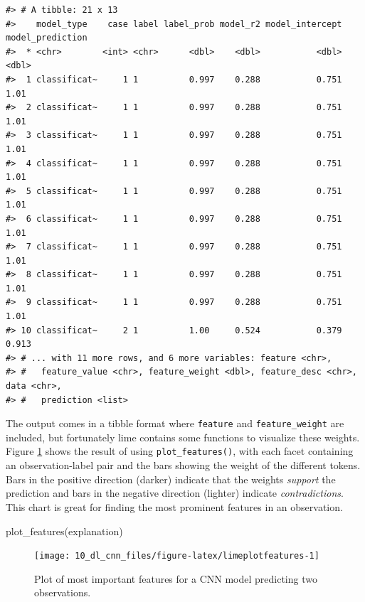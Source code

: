 \documentclass[
]{krantz}
\makeatletter
\newenvironment{Shaded}{\begin{snugshade}}{\end{snugshade}}
\newcommand{\FunctionTok}[1]{\textcolor[rgb]{0.00,0.00,0.00}{#1}}
\newcommand{\NormalTok}[1]{#1}
\newenvironment{kframe}{%
\medskip{}
\setlength{\fboxsep}{.8em}
 \def\at@end@of@kframe{}%
 \ifinner\ifhmode%
  \def\at@end@of@kframe{\end{minipage}}%
  \begin{minipage}{\columnwidth}%
 \fi\fi%
 \def\FrameCommand##1{\hskip\@totalleftmargin \hskip-\fboxsep
 \colorbox{shadecolor}{##1}\hskip-\fboxsep
     \hskip-\linewidth \hskip-\@totalleftmargin \hskip\columnwidth}%
 \MakeFramed {\advance\hsize-\width
   \@totalleftmargin\z@ \linewidth\hsize
   \@setminipage}}%
 {\par\unskip\endMakeFramed%
 \at@end@of@kframe}
\renewenvironment{Shaded}{\begin{kframe}}{\end{kframe}}
\makeatother
\begin{document}
\begin{verbatim}
#> # A tibble: 21 x 13
#>    model_type    case label label_prob model_r2 model_intercept model_prediction
#>  * <chr>        <int> <chr>      <dbl>    <dbl>           <dbl>            <dbl>
#>  1 classificat~     1 1          0.997    0.288           0.751            1.01 
#>  2 classificat~     1 1          0.997    0.288           0.751            1.01 
#>  3 classificat~     1 1          0.997    0.288           0.751            1.01 
#>  4 classificat~     1 1          0.997    0.288           0.751            1.01 
#>  5 classificat~     1 1          0.997    0.288           0.751            1.01 
#>  6 classificat~     1 1          0.997    0.288           0.751            1.01 
#>  7 classificat~     1 1          0.997    0.288           0.751            1.01 
#>  8 classificat~     1 1          0.997    0.288           0.751            1.01 
#>  9 classificat~     1 1          0.997    0.288           0.751            1.01 
#> 10 classificat~     2 1          1.00     0.524           0.379            0.913
#> # ... with 11 more rows, and 6 more variables: feature <chr>,
#> #   feature_value <chr>, feature_weight <dbl>, feature_desc <chr>, data <chr>,
#> #   prediction <list>
\end{verbatim}

The output comes in a tibble format where \texttt{feature} and \texttt{feature\_weight} are included, but fortunately lime contains some functions to visualize these weights. Figure \ref{fig:limeplotfeatures} shows the result of using \texttt{plot\_features()}, with each facet containing an observation-label pair and the bars showing the weight of the different tokens. Bars in the positive direction (darker) indicate that the weights \emph{support} the prediction and bars in the negative direction (lighter) indicate \emph{contradictions}. This chart is great for finding the most prominent features in an observation.

\begin{Shaded}
\begin{Highlighting}[]
\FunctionTok{plot\_features}\NormalTok{(explanation)}
\end{Highlighting}
\end{Shaded}

\begin{figure}

{\centering \texttt{[image: 10\_dl\_cnn\_files/figure-latex/limeplotfeatures-1]} 

}

\caption{Plot of most important features for a CNN model predicting two observations.}\label{fig:limeplotfeatures}
\end{figure}
\end{document}
